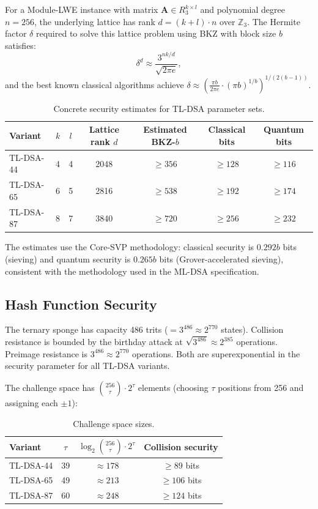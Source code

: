 \documentclass[11pt,a4paper]{article}
\theoremstyle{definition}
\newcommand{\Z}{\mathbb{Z}}
\begin{document}
For a Module-LWE instance with matrix $\mathbf{A} \in R_3^{k \times l}$ and polynomial degree $n = 256$, the underlying lattice has rank $d = (k + l) \cdot n$ over $\Z_3$. The Hermite factor $\delta$ required to solve this lattice problem using BKZ with block size $b$ satisfies:
\[
  \delta^d \approx \frac{3^{nk/d}}{\sqrt{2\pi e}},
\]
and the best known classical algorithms achieve $\delta \approx \left( \frac{\pi b}{2\pi e} \cdot (\pi b)^{1/b} \right)^{1/(2(b-1))}$.

\begin{table}[ht]
\centering
\caption{Concrete security estimates for TL-DSA parameter sets.}
\label{tab:security}
\begin{tabular}{@{}lcccccc@{}}
\toprule
Variant & $k$ & $l$ & Lattice rank $d$ & Estimated BKZ-$b$ & Classical bits & Quantum bits \\
\midrule
TL-DSA-44 & 4 & 4 & 2048 & $\geq 356$ & $\geq 128$ & $\geq 116$ \\
TL-DSA-65 & 6 & 5 & 2816 & $\geq 538$ & $\geq 192$ & $\geq 174$ \\
TL-DSA-87 & 8 & 7 & 3840 & $\geq 720$ & $\geq 256$ & $\geq 232$ \\
\bottomrule
\end{tabular}
\end{table}

The estimates use the Core-SVP methodology: classical security is $0.292b$ bits (sieving) and quantum security is $0.265b$ bits (Grover-accelerated sieving), consistent with the methodology used in the ML-DSA specification.

\subsection{Hash Function Security}

The ternary sponge has capacity 486 trits ($= 3^{486} \approx 2^{770}$ states). Collision resistance is bounded by the birthday attack at $\sqrt{3^{486}} \approx 2^{385}$ operations. Preimage resistance is $3^{486} \approx 2^{770}$ operations. Both are superexponential in the security parameter for all TL-DSA variants.

The challenge space has $\binom{256}{\tau} \cdot 2^\tau$ elements (choosing $\tau$ positions from 256 and assigning each $\pm 1$):

\begin{table}[ht]
\centering
\caption{Challenge space sizes.}
\label{tab:challenge}
\begin{tabular}{@{}lccc@{}}
\toprule
Variant & $\tau$ & $\log_2\binom{256}{\tau} \cdot 2^\tau$ & Collision security \\
\midrule
TL-DSA-44 & 39 & $\approx 178$ & $\geq 89$ bits \\
TL-DSA-65 & 49 & $\approx 213$ & $\geq 106$ bits \\
TL-DSA-87 & 60 & $\approx 248$ & $\geq 124$ bits \\
\bottomrule
\end{tabular}
\end{table}
\end{document}
